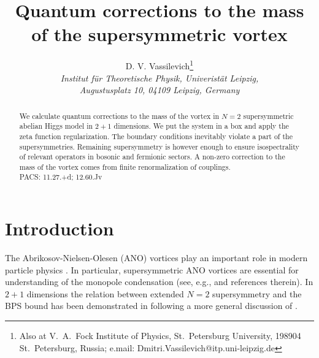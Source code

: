 \documentclass[a4paper,12pt]{article}
\begin{document}
\title{Quantum corrections to the mass of the supersymmetric vortex}
\author{D. V. Vassilevich\thanks{Also at V.~A.~Fock Institute of Physics,
St.~Petersburg University, 198904 St.~Petersburg, Russia; e.mail:
Dmitri.Vassilevich@itp.uni-leipzig.de}\\
{\it Institut f\"{u}r Theoretische Physik,
Univerist\"{a}t Leipzig,}\\{\it  Augustusplatz 10, 04109 Leipzig, Germany}}
\maketitle
\begin{abstract}
We calculate quantum corrections to the mass of the vortex in $N=2$
supersymmetric abelian Higgs model in $2+1$ dimensions. We put the system
in a box and apply the zeta function regularization. The boundary conditions 
inevitably violate a part of the supersymmetries. Remaining supersymmetry
is however enough to ensure isospectrality of relevant operators in bosonic
and fermionic sectors. A non-zero correction to the mass of the vortex
comes from finite renormalization of couplings.\\
PACS: 11.27.+d; 12.60.Jv 
\end{abstract}
\section{Introduction}
The Abrikosov-Nielsen-Olesen (ANO) vortices \cite{ano} play an important
role in modern particle physics \cite{Achucarro:1999it}.
In particular, supersymmetric ANO vortices are essential for understanding
of the monopole condensation (see, e.g., \cite{Vainshtein:2000hu} and
references therein). In $2+1$ dimensions the relation between extended
$N=2$ supersymmetry and the BPS bound has been demonstrated in
\cite{Edelstein:bb} following a more general 
discussion of \cite{Hlousek:1991ej}. 
\end{document}
